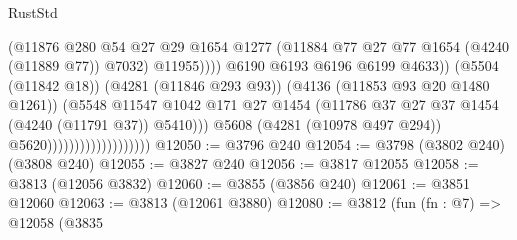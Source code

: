 \begin{lexlean}{RustStd}
\begin{coremodule}
                                                      (@11876
                                                        @280
                                                        @54
                                                        @27
                                                        @29
                                                        @1654
                                                        @1277
                                                        (@11884
                                                          @77
                                                          @27
                                                          @77
                                                          @1654
                                                          (@4240 (@11889 @77))
                                                          @7032)
                                                        @11955))))
                                                @6190
                                                @6193
                                                @6196
                                                @6199
                                                @4633))
                                            (@5504 (@11842 @18))
                                            (@4281 (@11846 @293 @93))
                                            (@4136 (@11853 @93 @20 @1480 @1261))
                                            (@5548
                                              @11547
                                              @1042
                                              @171
                                              @27
                                              @1454
                                              (@11786
                                                @37
                                                @27
                                                @37
                                                @1454
                                                (@4240 (@11791 @37))
                                                @5410)))
                                          @5608
                                          (@4281 (@10978 @497 @294))
                                          @5620)))))))))))))))))))
@12050 := @3796 @240
@12054 := @3798 (@3802 @240) (@3808 @240)
@12055 := @3827 @240
@12056 := @3817 @12055
@12058 := @3813 (@12056 @3832)
@12060 := @3855 (@3856 @240)
@12061 := @3851 @12060
@12063 := @3813 (@12061 @3880)
@12080 := @3812
    (fun (fn : @7) =>
    @12058
      (@3835

\end{coremodule}
\end{lexlean}
